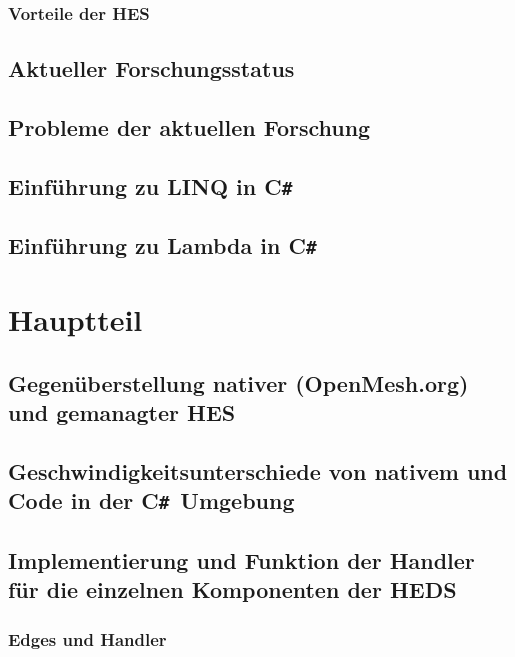 \documentclass[12pt,a4paper]{scrreprt}
\newcommand{\CS}{C\texttt{\#}}
\newcommand{\CSS}{C\texttt{\# }}
\begin{document}
		\subsection {Vorteile der HES}
	\section {Aktueller Forschungsstatus}
	\section {Probleme der aktuellen Forschung}
	\section {Einführung zu LINQ in \CS}
	\section {Einführung zu Lambda in \CS}




\chapter {Hauptteil}
	\section {Gegenüberstellung nativer (OpenMesh.org) und gemanagter HES}
	\section {Geschwindigkeitsunterschiede von nativem und Code in der \CSS Umgebung}
	\section {Implementierung und Funktion der Handler für die einzelnen Komponenten der HEDS}
		\subsection {Edges und Handler}
\end{document}
